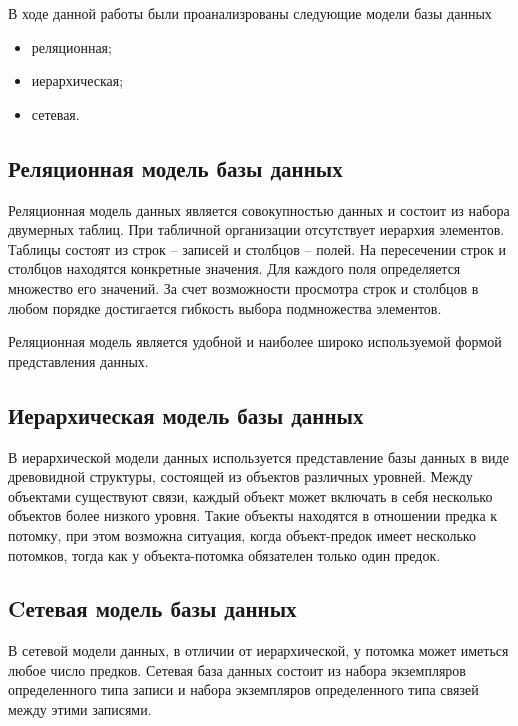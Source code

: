 В ходе данной работы были проанализрованы следующие модели базы данных
\begin{itemize}
	\item реляционная;
	\item иерархическая;
	\item сетевая.
\end{itemize}

\subsection{Реляционная модель базы данных}
Реляционная модель данных является совокупностью данных и состоит из набора двумерных таблиц. При табличной организации отсутствует иерархия элементов. Таблицы состоят из строк – записей и столбцов – полей. На пересечении строк и столбцов находятся конкретные значения. Для каждого поля определяется множество его значений. За счет возможности просмотра строк и столбцов в любом порядке достигается гибкость выбора подмножества элементов.

Реляционная модель является удобной и наиболее широко используемой формой представления данных.


\subsection{Иерархическая модель базы данных}
В иерархической модели данных используется представление базы данных в виде древовидной структуры, состоящей из объектов различных уровней. Между объектами существуют связи, каждый объект может включать в себя несколько объектов более низкого уровня. Такие объекты находятся в отношении предка к потомку, при этом возможна ситуация, когда объект-предок имеет несколько потомков, тогда как у объекта-потомка обязателен только один предок.


\subsection{Cетевая модель базы данных}
В сетевой модели данных, в отличии от иерархической, у потомка может иметься любое число предков. Сетевая база данных состоит из набора экземпляров определенного типа записи и набора экземпляров определенного типа связей между этими записями.

